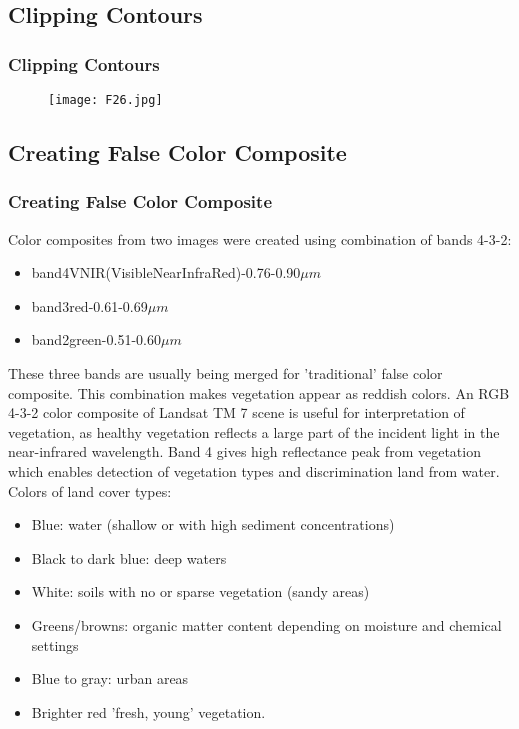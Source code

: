 \documentclass[pdflatex,compress,8pt,
	xcolor={dvipsnames,dvipsnames,svgnames,x11names,table},
	hyperref={
	breaklinks = true, 
	pdfauthor={Lemenkova Polina}, 
	pdfsubject={Preentation}, 
	pdfcreator={Lemenkova Polina}, 
	pdfproducer={Lemenkova Polina}, 
	colorlinks=true,linkcolor=blue, 
	citecolor=NavyBlue, 
	urlcolor = NavyBlue, 
	breaklinks = true}]{beamer}
\begin{document}
\subsection{Clipping Contours}
\begin{frame}\frametitle{Clipping Contours}
\begin{figure}[H]
	\centering
		\texttt{[image: F26.jpg]}
\end{figure}
\end{frame}
 
\subsection{Creating False Color Composite}
\begin{frame}\frametitle{Creating False Color Composite}
Color composites from two images were created using combination of bands 4-3-2:
\begin{itemize}
	\item band4VNIR(VisibleNearInfraRed)-0.76-0.90$\mu m$ 
	\item band3red-0.61-0.69$\mu m$
	\item band2green-0.51-0.60$\mu m$
\end{itemize}
These three bands are usually being merged for 'traditional' false color composite. This combination makes vegetation appear as reddish colors. An RGB 4-3-2 color composite of Landsat TM 7 scene is useful for interpretation of vegetation, as healthy vegetation reflects a large part of the incident light in the near-infrared wavelength. Band 4 gives high reflectance peak from vegetation which enables detection of vegetation types and discrimination land from water. \\
Colors of land cover types: 
\begin{itemize}
	\item Blue: water (shallow or with high sediment concentrations)
	\item Black to dark blue: deep waters
	\item White: soils with no or sparse vegetation (sandy areas)
	\item Greens/browns: organic matter content depending on moisture and chemical settings
	\item Blue to gray: urban areas
	\item Brighter red 'fresh, young' vegetation.
\end{itemize}
\end{frame}
\end{document}
